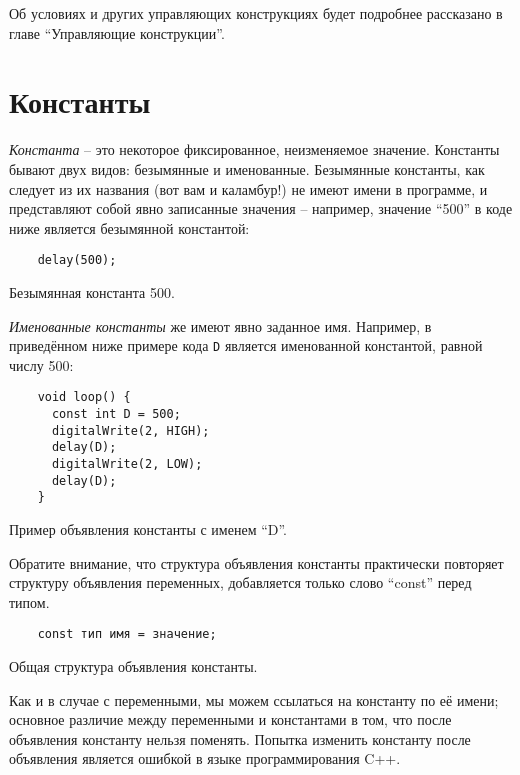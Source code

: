 \documentclass[../sparc.tex]{subfiles}
\begin{document}
Об условиях и других управляющих конструкциях будет подробнее рассказано в главе
``Управляющие конструкции''.

\section{Константы}

\emph{Константа} -- это некоторое фиксированное, неизменяемое значение.
Константы бывают двух видов: безымянные и именованные.  Безымянные константы,
как следует из их названия (вот вам и каламбур!) не имеют имени в программе, и
представляют собой явно записанные значения -- например, значение ``500'' в коде
ниже является безымянной константой:

\begin{listing}[ht]
  \begin{verbatim}
    delay(500);
  \end{verbatim}
  \label{listing:dialogues-with-computer-unnamed-const}
  \caption{Безымянная константа 500.}
\end{listing}

\emph{Именованные константы} же имеют явно заданное имя.  Например, в
приведённом ниже примере кода \texttt{D} является именованной константой, равной
числу 500:

\begin{listing}[ht]
  \begin{verbatim}
    void loop() {
      const int D = 500;
      digitalWrite(2, HIGH);
      delay(D);
      digitalWrite(2, LOW);
      delay(D);
    }
  \end{verbatim}
  \label{listing:dialogues-with-computer-const}
  \caption{Пример объявления константы с именем ``D''.}
\end{listing}

Обратите внимание, что структура объявления константы практически повторяет
структуру объявления переменных, добавляется только слово ``const'' перед типом.

\begin{listing}[ht]
  \begin{verbatim}
    const тип имя = значение;
  \end{verbatim}
  \label{listing:dialogues-with-computer-const-definition-structure}
  \caption{Общая структура объявления константы.}
\end{listing}

Как и в случае с переменными, мы можем ссылаться на константу по её имени;
основное различие между переменными и константами в том, что после объявления
константу нельзя поменять.  Попытка изменить константу после объявления является
ошибкой в языке программирования C++.
\end{document}
